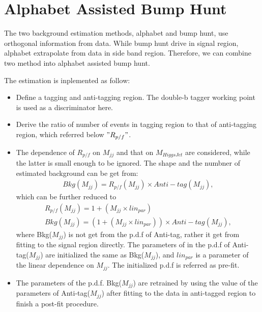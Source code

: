 \clearpage
\section{Alphabet Assisted Bump Hunt}
The two background estimation methods, alphabet and bump hunt, use orthogonal information from data.
While bump hunt drive in signal region, alphabet extrapolate from data in side band region. 
Therefore, we can combine two method into alphabet assisted bump hunt.

The estimation is inplemented as follow:
\begin{itemize}
\item Define a tagging and anti-tagging region. The double-b tagger working point is used as a discriminator here.
\item Derive the ratio of number of events in tagging region to that of anti-tagging region, which referred below $" R_{p/f} "$.
\item The dependence of $R_{p/f}$ on $M_{jj}$ and that on $M_{Higgs Jet}$ are considered, while the latter is small enough to be ignored. The shape and the numbner of estimated background can be get from:
\begin{equation} \label{eq3}
\begin{split}
Bkg(M_{jj})= R_{p/f}(M_{jj}) \times Anti-tag(M_{jj}), 
\end{split}
\end{equation}
which can be further reduced to 
\begin{equation} \label{eq4}
\begin{split}
R_{p/f}(M_{jj})= 1+(M_{jj} \times lin_{par}) \\
Bkg(M_{jj})= (1+(M_{jj} \times lin_{par})) \times Anti-tag(M_{jj}),
\end{split}
\end{equation}
where Bkg($M_{jj}$) is not get from the p.d.f of Anti-tag, rather it get from fitting to the signal region directly.
The parameters of in the p.d.f of Anti-tag($M_{jj}$) are initialized the same as Bkg($M_{jj}$), and $lin_{par}$ is a parameter of the linear dependence on $M_{jj}$. The initialized p.d.f is referred as pre-fit.
\item  The parameters of the p.d.f. Bkg($M_{jj}$) are retrained by using the value of the parameters of Anti-tag($M_{jj}$) after fitting to the data in anti-tagged region to finish a post-fit procedure. 

\end{itemize}
